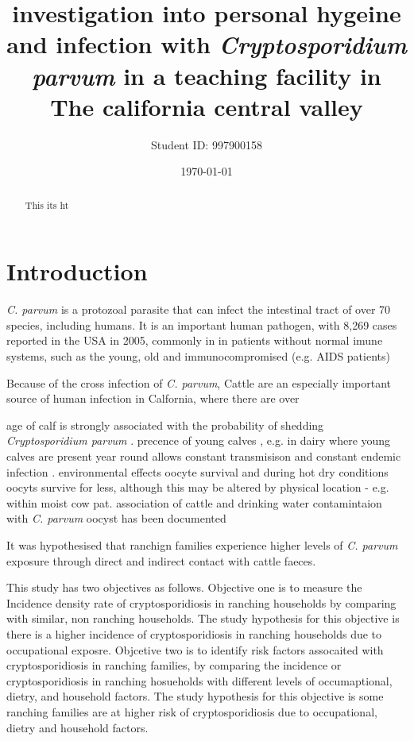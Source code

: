 \documentclass[12pt]{article}
\title{investigation into personal hygeine and infection with \emph{Cryptosporidium parvum} in a teaching facility in The california central valley}
\author{Student ID: 997900158}
\date{\today}
\begin{document}
	\maketitle
	\begin{abstract}
		This its ht 

	\end{abstract}

\doublespacing
	\section{Introduction} 
	\emph{C. parvum} is a protozoal parasite that can infect the intestinal tract of over 70 species, \cite{Casemore1997} including humans.
	It is an important human pathogen, with 8,269 cases reported in the USA in 2005, commonly in in patients without normal imune systems, such as the young, old and immunocompromised (e.g. AIDS patients) \cite{Yoder2007}


	Because of the cross infection of \emph{C. parvum}, Cattle are an especially important source of human infection in Calfornia, where there are over \cite{WesternFarm}

	age of calf is strongly associated with the probability of shedding \emph{Cryptosporidium parvum} \cite{Atwill1999a}.
	precence of young calves , e.g. in dairy where young calves are present year round allows constant transmisison and constant endemic infection .\cite{Atwill1998}
	environmental effects oocyte survival and 
	during hot dry conditions oocyts survive for less, although this may be altered by physical location - e.g. within moist cow pat. \cite{Robertson1992}
	association of cattle and drinking water contamintaion with \emph{C. parvum} oocyst has been documented \cite{Ong1996}


	It was hypothesised that ranchign families experience higher levels of \emph{C. parvum} exposure through direct and indirect contact with cattle faeces. 

		
	This study has two objectives as follows. 
	Objective one is to measure the Incidence density rate of cryptosporidiosis in ranching households by comparing with similar, non ranching households.
	The study hypothesis for this objective is there is a higher incidence of cryptosporidiosis in ranching households due to occupational exposre. 
	Objcetive two is to identify risk factors assocaited with cryptosporidiosis in ranching families, by comparing the incidence or cryptosporidiosis in ranching hosueholds with different levels of occumaptional, dietry, and household factors.
	The study hypothesis for this objective is some ranching families are at higher risk of cryptosporidiosis due to occupational, dietry and household factors.
\end{document}
